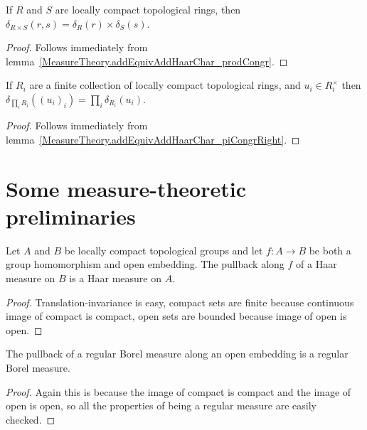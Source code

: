 \begin{lemma}
  \label{MeasureTheory.ringHaarChar_prod}
  \leanok
  If $R$ and $S$ are locally compact topological rings, then $\delta_{R\times S}(r,s)=\delta_R(r)\times\delta_S(s)$.
\end{lemma}
\begin{proof}
  \leanok
  Follows immediately from lemma~\ref{MeasureTheory.addEquivAddHaarChar_prodCongr}.
\end{proof}

\begin{lemma}
  \label{MeasureTheory.ringHaarChar_pi}
  \leanok
  If $R_i$ are a finite collection of locally compact topological rings,
  and $u_i\in R_i^\times$ then $\delta_{\prod_i R_i}((u_i)_i)=\prod_i\delta_{R_i}(u_i)$.
\end{lemma}
\begin{proof}
  \leanok
  Follows immediately from lemma~\ref{MeasureTheory.addEquivAddHaarChar_piCongrRight}.
\end{proof}

\section{Some measure-theoretic preliminaries}

\begin{lemma}
  \label{Topology.IsOpenEmbedding.isHaarMeasure_comap}
  \leanok
  Let $A$ and $B$ be locally compact topological groups
  and let $f:A\to B$ be both a group homomorphism and open embedding.
  The pullback along $f$ of a Haar measure on $B$ is a Haar measure on $A$.
\end{lemma}
\begin{proof}
  \leanok
  Translation-invariance is easy, compact sets are finite because continuous
  image of compact is compact, open sets are bounded because image of open is open.
\end{proof}

\begin{lemma}
  \label{Topology.IsOpenEmbedding.regular_comap}
  \leanok
  The pullback of a regular Borel measure along an open
  embedding is a regular Borel measure.
\end{lemma}
\begin{proof}
  \leanok
  Again this is because the image of compact is compact and the
  image of open is open, so all the properties of being a regular measure
  are easily checked.
\end{proof}

